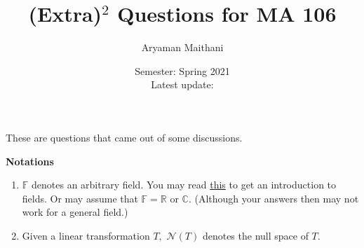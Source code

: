 \documentclass[12pt]{article}
\title{(Extra)\texorpdfstring{$^2$}{2} Questions for MA 106}
\author{Aryaman Maithani}%
\date{Semester: Spring 2021\\ Latest update: \DTMnow}
\begin{document}
\maketitle

These are questions that came out of some discussions.

\textbf{Notations}
\begin{enumerate}
	\item $\mathbb{F}$ denotes an arbitrary field. You may read \href{https://aryamanmaithani.github.io/ma-106-2021-tut/fields-and-vector-spaces.pdf}{this} to get an introduction to fields. Or may assume that $\mathbb{F} = \mathbb{R}$ or $\mathbb{C}.$ (Although your answers then may not work for a general field.)
	\item Given a linear transformation $T,$ $\mathcal{N}(T)$ denotes the null space of $T.$
\end{enumerate}
\end{document}
